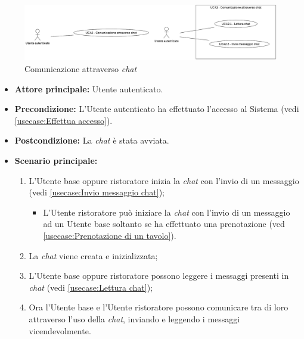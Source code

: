 \label{usecase:Comunicazione attraverso chat}

\begin{figure}[h]
	\centering
	\includegraphics[width=0.999\textwidth]{./uml/UCA2.png} 
	\caption{Comunicazione attraverso \textit{chat}}
	\label{fig:UCA2}
  \end{figure}

\begin{itemize}
	\item \textbf{Attore principale:} Utente autenticato.

	\item \textbf{Precondizione:} L'Utente autenticato ha effettuato l'accesso al Sistema (vedi \autoref{usecase:Effettua accesso}).

	\item \textbf{Postcondizione:} La \textit{chat} è stata avviata.

	\item \textbf{Scenario principale:}
	      \begin{enumerate}
		      \item L'Utente base oppure ristoratore inizia la \textit{chat} con l'invio di un messaggio (vedi \autoref{usecase:Invio messaggio chat});
		            \begin{itemize}
			            \item L'Utente ristoratore può iniziare la \textit{chat} con l'invio di un messaggio ad un Utente base soltanto se ha effettuato una prenotazione (ved \autoref{usecase:Prenotazione di un tavolo}).
		            \end{itemize}
		      \item La \textit{chat} viene creata e inizializzata;
		      \item L'Utente base oppure ristoratore possono leggere i messaggi presenti in \textit{chat} (vedi \autoref{usecase:Lettura chat});
		      \item Ora l'Utente base e l'Utente ristoratore possono comunicare tra di loro attraverso l'uso della \textit{chat}, inviando e leggendo i messaggi vicendevolmente.
	      \end{enumerate}
\end{itemize}

